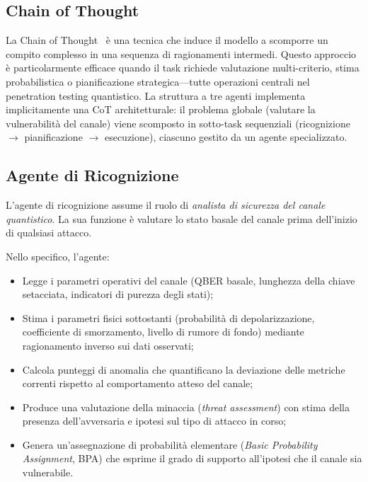 \subsection*{Chain of Thought}
La Chain of Thought~\cite{wei2022cot} è una tecnica che induce il modello a scomporre un compito complesso in una sequenza di ragionamenti intermedi. Questo approccio è particolarmente efficace quando il task richiede valutazione multi-criterio, stima probabilistica o pianificazione strategica---tutte operazioni centrali nel penetration testing quantistico. La struttura a tre agenti implementa implicitamente una CoT architetturale: il problema globale (valutare la vulnerabilità del canale) viene scomposto in sotto-task sequenziali (ricognizione $\rightarrow$ pianificazione $\rightarrow$ esecuzione), ciascuno gestito da un agente specializzato.

\subsection{Agente di Ricognizione}
\label{subsec:recon-agent}

L'agente di ricognizione assume il ruolo di \emph{analista di sicurezza del canale quantistico}. La sua funzione è valutare lo stato basale del canale prima dell'inizio di qualsiasi attacco.

Nello specifico, l'agente:
\begin{itemize}
    \item Legge i parametri operativi del canale (QBER basale, lunghezza della chiave setacciata, indicatori di purezza degli stati);
    
    \item Stima i parametri fisici sottostanti (probabilità di depolarizzazione, coefficiente di smorzamento, livello di rumore di fondo) mediante ragionamento inverso sui dati osservati;
    
    \item Calcola punteggi di anomalia che quantificano la deviazione delle metriche correnti rispetto al comportamento atteso del canale;
    
    \item Produce una valutazione della minaccia (\emph{threat assessment}) con stima della presenza dell'avversaria e ipotesi sul tipo di attacco in corso;
    
    \item Genera un'assegnazione di probabilità elementare (\emph{Basic Probability Assignment}, BPA) che esprime il grado di supporto all'ipotesi che il canale sia vulnerabile.
\end{itemize}

